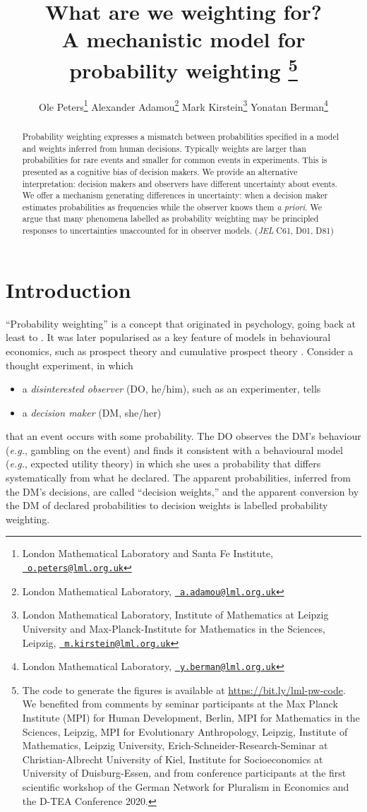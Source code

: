 \documentclass[12pt,letter,timesnewroman]{article}
\title{%
\vspace{-3em}
What are we weighting for?\\
\large{A mechanistic model for probability weighting}
\thanks{The code to generate the figures is available at \url{https://bit.ly/lml-pw-code}.
We benefited from comments by seminar participants at
the Max Planck Institute (MPI) for Human Development, Berlin,
MPI for Mathematics in the Sciences, Leipzig,
MPI for Evolutionary Anthropology, Leipzig,
Institute of Mathematics, Leipzig University,
Erich-Schneider-Research-Seminar at Christian-Albrecht University of Kiel,
Institute for Socioeconomics at University of Duisburg-Essen,
and from conference participants at
the first scientific workshop of the German Network for Pluralism in Economics
and the D-TEA Conference 2020.}
}
\author{\hfill Ole Peters\thanks{London Mathematical Laboratory and Santa Fe Institute, \texttt{\href{mailto:o.peters@lml.org.uk}{\Letter~o.peters@lml.org.uk}}}
\hfill
Alexander Adamou\thanks{London Mathematical Laboratory, \texttt{\href{mailto:a.adamou@lml.org.uk}{\Letter~a.adamou@lml.org.uk}}}
\hfill
Mark Kirstein\thanks{London Mathematical Laboratory, Institute of Mathematics at Leipzig University and Max-Planck-Institute for Mathematics in the Sciences, Leipzig, \texttt{\href{mailto:m.kirstein@lml.org.uk}{\Letter~m.kirstein@lml.org.uk}}}
Yonatan Berman\thanks{London Mathematical Laboratory, \texttt{\href{mailto:y.berman@lml.org.uk}{\Letter~y.berman@lml.org.uk}}}
\hfill
}
\newcommand{\bi}{\begin{itemize}}
\newcommand{\ei}{\end{itemize}}
\newcommand{\eg}{\textit{e.g.}}
\begin{document}
\begin{titlepage}
	\maketitle
\begin{abstract}
\noindent Probability weighting expresses a mismatch between probabilities specified in a model and weights inferred from human decisions. Typically weights are larger than probabilities for rare events and smaller for common events in experiments. This is presented as a cognitive bias of decision makers. We provide an alternative interpretation: decision makers and observers have different uncertainty about events. We offer a mechanism generating differences in uncertainty: when a decision maker estimates probabilities as frequencies while the observer knows them \textit{a priori}. We argue that many phenomena labelled as probability weighting may be principled responses to uncertainties unaccounted for in observer models.
(\textit{JEL} C61, D01, D81)
\bigskip
\end{abstract}
\end{titlepage}
 
\setcounter{page}{2}		%

\section{Introduction}
``Probability weighting'' is a concept that originated in psychology, going back at least to \textcite{PrestonBaratta1948}.
It was later popularised as a key feature of models in behavioural economics, such as prospect theory \parencite{KahnemanTversky1979} and cumulative prospect theory \parencite{TverskyKahneman1992}.
Consider a thought experiment, in which  
\bi
	\item a \textit{disinterested observer} (DO, he/him), such as an experimenter, tells
	\item a \textit{decision maker} (DM, she/her)
\ei
that an event occurs with some probability. The DO observes the DM's behaviour (\eg, gambling on the event) and finds it consistent with a behavioural model (\eg, expected utility theory) in which she uses a probability that differs systematically from what he declared. The apparent probabilities, inferred from the DM's decisions, are called ``decision weights,'' and the apparent conversion by the DM of declared probabilities to decision weights is labelled probability weighting.
\end{document}
